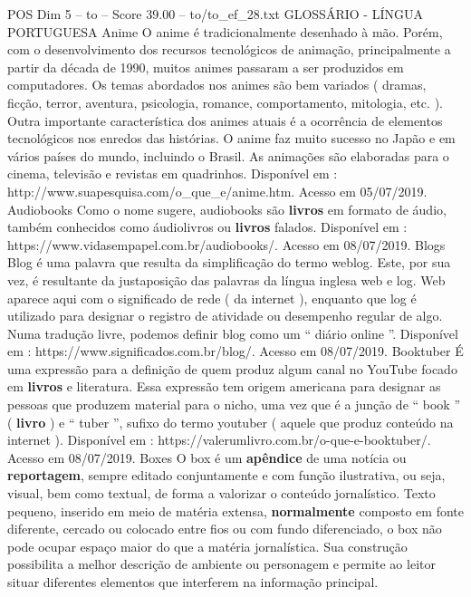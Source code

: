 \begin{textsample}{POS Dim 5 – to – Score 39.00 – to/to\_ef\_28.txt}  \label{ex:f5_pos_021}
GLOSSÁRIO - LÍNGUA PORTUGUESA Anime O anime é tradicionalmente desenhado à mão.
Porém, com o desenvolvimento dos recursos tecnológicos de animação, principalmente a partir da década de 1990, muitos animes passaram a ser produzidos em computadores.
Os temas abordados nos animes são bem variados ( dramas, ficção, terror, aventura, psicologia, romance, comportamento, mitologia, etc. ).
Outra importante característica dos animes atuais é a ocorrência de elementos tecnológicos nos enredos das histórias.
O anime faz muito sucesso no Japão e em vários países do mundo, incluindo o Brasil.
As animações são elaboradas para o cinema, televisão e revistas em quadrinhos.
Disponível em : http://www.suapesquisa.com/o\_que\_e/anime.htm.
Acesso em 05/07/2019.
Audiobooks Como o nome sugere, audiobooks são \textbf{livros} em formato de áudio, também conhecidos como áudiolivros ou \textbf{livros} falados.
Disponível em : https://www.vidasempapel.com.br/audiobooks/.
Acesso em 08/07/2019.
Blogs Blog é uma palavra que resulta da simplificação do termo weblog.
Este, por sua vez, é resultante da justaposição das palavras da língua inglesa web e log.
Web aparece aqui com o significado de rede ( da internet ), enquanto que log é utilizado para designar o registro de atividade ou desempenho regular de algo.
Numa tradução livre, podemos definir blog como um “ diário online ”.
Disponível em : https://www.significados.com.br/blog/.
Acesso em 08/07/2019.
Booktuber É uma expressão para a definição de quem produz algum canal no YouTube focado em \textbf{livros} e literatura.
Essa expressão tem origem americana para designar as pessoas que produzem material para o nicho, uma vez que é a junção de “ book ” ( \textbf{livro} ) e “ tuber ”, sufixo do termo youtuber ( aquele que produz conteúdo na internet ).
Disponível em : https://valerumlivro.com.br/o-que-e-booktuber/.
Acesso em 08/07/2019.
Boxes O box é um \textbf{apêndice} de uma notícia ou \textbf{reportagem}, sempre editado conjuntamente e com função ilustrativa, ou seja, visual, bem como textual, de forma a valorizar o conteúdo jornalístico.
Texto pequeno, inserido em meio de matéria extensa, \textbf{normalmente} composto em fonte diferente, cercado ou colocado entre fios ou com fundo diferenciado, o box não pode ocupar espaço maior do que a matéria jornalística.
Sua construção possibilita a melhor descrição de ambiente ou personagem e permite ao leitor situar diferentes elementos que interferem na informação principal.

\end{textsample}
